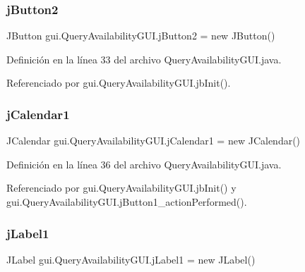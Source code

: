 \subsubsection{\texorpdfstring{jButton2}{jButton2}}
{\footnotesize\ttfamily J\+Button gui.\+Query\+Availability\+G\+U\+I.\+j\+Button2 = new J\+Button()\hspace{0.3cm}{\ttfamily [private]}}



Definición en la línea 33 del archivo Query\+Availability\+G\+U\+I.\+java.



Referenciado por gui.\+Query\+Availability\+G\+U\+I.\+jb\+Init().

\mbox{\label{classgui_1_1_query_availability_g_u_i_ad49fbf793d6741017c225cdb8c990e57}} 
\subsubsection{\texorpdfstring{jCalendar1}{jCalendar1}}
{\footnotesize\ttfamily J\+Calendar gui.\+Query\+Availability\+G\+U\+I.\+j\+Calendar1 = new J\+Calendar()\hspace{0.3cm}{\ttfamily [private]}}



Definición en la línea 36 del archivo Query\+Availability\+G\+U\+I.\+java.



Referenciado por gui.\+Query\+Availability\+G\+U\+I.\+jb\+Init() y gui.\+Query\+Availability\+G\+U\+I.\+j\+Button1\+\_\+action\+Performed().

\mbox{\label{classgui_1_1_query_availability_g_u_i_a78193c8fc1d276556b8bf6588c8b001d}} 
\subsubsection{\texorpdfstring{jLabel1}{jLabel1}}
{\footnotesize\ttfamily J\+Label gui.\+Query\+Availability\+G\+U\+I.\+j\+Label1 = new J\+Label()\hspace{0.3cm}{\ttfamily [private]}}



